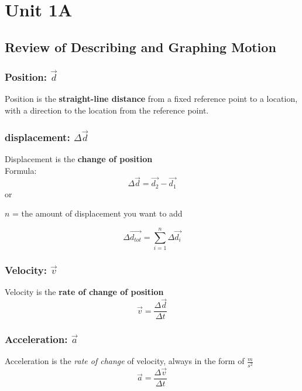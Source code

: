 \chapter{Unit 1A}
\section{Review of Describing and Graphing Motion}
\subsection{Position: $\vec{d}$}
Position is the \textbf{straight-line distance} from a fixed reference point to a location, with a direction to the location from the reference point.

\subsection{displacement: $\Delta\vec{d}$}
Displacement is the \textbf{change of position} \\
Formula: \\
\[
	\Delta\vec{d} = \vec{d_{2}} - \vec{d_{1}}
\] 
or \\
\begin{center}
    $n$ = the amount of displacement you want to add
\end{center}
\[
	\Delta\vec{d_{tot}} =  \sum_{i = 1}^{n} \Delta\vec{d_{i}}
\]

\subsection{Velocity: $\vec{v}$}
Velocity is the \textbf{rate of change of position}
\[
	\vec{v} = \frac{\Delta\vec{d}}{\Delta t}
\]

\subsection{Acceleration: $\vec{a}$}
Acceleration is the \textit{rate of change} of velocity, always in the form of $\frac{m}{s^2}$
\[
\vec{a} = \frac{\Delta \vec{v}}{\Delta t}
\]

